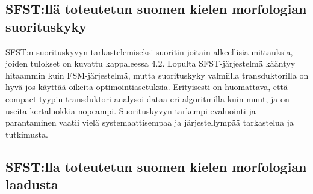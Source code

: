 \documentclass[free]{flammie}
\begin{document}
\subsection{SFST:llä toteutetun suomen kielen morfologian suorituskyky}

SFST:n suorituskyvyn tarkastelemiseksi suoritin joitain alkeellisia mittauksia,
joiden tulokset on kuvattu kappaleessa 4.2. Lopulta SFST-järjestelmä kääntyy hitaammin kuin FSM-järjestelmä, mutta suorituskyky valmiilla transduktorilla
on hyvä jos käyttää oikeita optimointiasetuksia. Erityisesti on huomattava, että
compact-tyypin transduktori analysoi dataa eri algoritmilla kuin muut, ja on useita kertaluokkia nopeampi.
Suorituskyvyn tarkempi evaluointi ja parantaminen vaatii vielä systemaattisempaa
ja järjestellympää tarkastelua ja tutkimusta.

\subsection{SFST:lla toteutetun suomen kielen morfologian laadusta}
\end{document}

